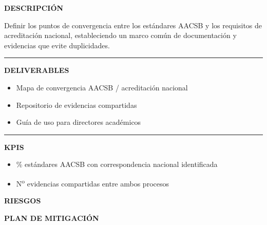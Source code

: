 \documentclass[11pt,a4paper]{scrreprt}
\newcommand{\fieldlabel}[1]{%
  {\footnotesize\sffamily\bfseries\color{mutedcolor}\MakeUppercase{#1}}\par\nopagebreak[4]
}
\newcommand{\fieldsep}{\vspace{3pt}\noindent\textcolor{bordercolor}{\rule{\linewidth}{0.4pt}}\vspace{3pt}\par}
\begin{document}
\begin{tcolorbox}[pabox={gobcolor}{PA2.1 \enspace\textbullet\enspace Integración de procesos AACSB y acreditación nacional}]

\fieldlabel{Descripci\'on}
{\small Definir los puntos de convergencia entre los estándares AACSB y los requisitos de acreditación nacional, estableciendo un marco común de documentación y evidencias que evite duplicidades.}\par
\fieldsep
\fieldlabel{Deliverables}
{\small \begin{itemize}[noitemsep,topsep=2pt]
\item Mapa de convergencia AACSB / acreditación nacional
\item Repositorio de evidencias compartidas
\item Guía de uso para directores académicos
\end{itemize}}\par
\fieldsep
\fieldlabel{KPIs}
{\small \begin{itemize}[noitemsep,topsep=2pt]
\item \% estándares AACSB con correspondencia nacional identificada
\item N\textsuperscript{o} evidencias compartidas entre ambos procesos
\end{itemize}}\par
\end{tcolorbox}
\begin{tcolorbox}[riskbox]
{\footnotesize\sffamily\bfseries\color{red!50!black} RIESGOS}\par{}
\end{tcolorbox}
\begin{tcolorbox}[mitbox]
{\footnotesize\sffamily\bfseries\color{green!40!black} PLAN DE MITIGACI\'ON}\par{}
\end{tcolorbox}
\vspace{8pt}
\end{document}
